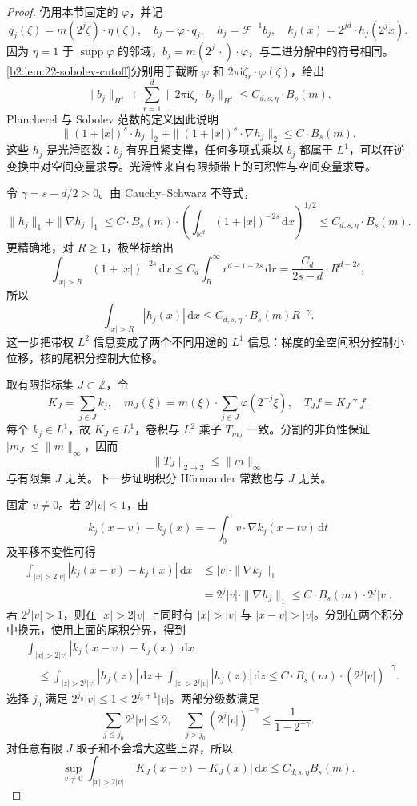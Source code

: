\begin{proof}
仍用本节固定的 \(\varphi\)，并记
\[
 q_j(\zeta)=m(2^j\zeta)\cdot\eta(\zeta),\quad
 b_j=\varphi\cdot q_j,\quad h_j=\mathcal F^{-1}b_j,\quad
 k_j(x)=2^{jd}\cdot h_j(2^jx).
\]
因为 \(\eta=1\) 于 \(\operatorname{supp}\varphi\) 的邻域，\(b_j=m(2^j\,\cdot)\cdot\varphi\)，与二进分解中的符号相同。\cref{b2:lem:22-sobolev-cutoff}分别用于截断 \(\varphi\) 和 \(2\pi\mathrm i\zeta_r\cdot\varphi(\zeta)\)，给出
\[
 \|b_j\|_{H^s}+\sum_{r=1}^{d}
 \|2\pi\mathrm i\zeta_r\cdot b_j\|_{H^s}
 \leq C_{d,s,\eta}\cdot B_s(m).
\]
Plancherel 与 Sobolev 范数的定义因此说明
\[
 \|(1+|x|)^s\cdot h_j\|_2
 +\|(1+|x|)^s\cdot\nabla h_j\|_2
 \leq C\cdot B_s(m).
\]
这些 \(h_j\) 是光滑函数：\(b_j\) 有界且紧支撑，任何多项式乘以 \(b_j\) 都属于 \(L^1\)，可以在逆变换中对空间变量求导。光滑性来自有限频带上的可积性与空间变量求导。

令 \(\gamma=s-d/2>0\)。由 Cauchy--Schwarz 不等式，
\[
 \|h_j\|_1+\|\nabla h_j\|_1
 \leq C\cdot B_s(m)\cdot
 \left(\int_{\mathbb R^d}(1+|x|)^{-2s}\,\mathrm dx\right)^{1/2}
 \leq C_{d,s,\eta}\cdot B_s(m).
\]
更精确地，对 \(R\geq1\)，极坐标给出
\[
 \int_{|x|>R}(1+|x|)^{-2s}\,\mathrm dx
 \leq C_d\int_R^\infty r^{d-1-2s}\,\mathrm dr
 =\frac{C_d}{2s-d}\cdot R^{d-2s},
\]
所以
\[
 \int_{|x|>R}|h_j(x)|\,\mathrm dx
 \leq C_{d,s,\eta}\cdot B_s(m)R^{-\gamma}.
\]
这一步把带权 \(L^2\) 信息变成了两个不同用途的 \(L^1\) 信息：梯度的全空间积分控制小位移，核的尾积分控制大位移。

取有限指标集 \(J\subset\mathbb Z\)，令
\[
 K_J=\sum_{j\in J}k_j,\quad
 m_J(\xi)=m(\xi)\cdot\sum_{j\in J}\varphi(2^{-j}\xi),
 \quad T_Jf=K_J*f.
\]
每个 \(k_j\in L^1\)，故 \(K_J\in L^1\)，卷积与 \(L^2\) 乘子 \(T_{m_J}\) 一致。分割的非负性保证 \(|m_J|\leq\|m\|_\infty\)，因而
\[
 \|T_J\|_{2\to2}\leq\|m\|_\infty
\]
与有限集 \(J\) 无关。下一步证明积分 Hörmander 常数也与 \(J\) 无关。

固定 \(v\ne0\)。若 \(2^j|v|\leq1\)，由
\[
 k_j(x-v)-k_j(x)
 =-\int_0^1v\cdot\nabla k_j(x-tv)\,\mathrm dt
\]
及平移不变性可得
\[
 \begin{aligned}
 \int_{|x|>2|v|}|k_j(x-v)-k_j(x)|\,\mathrm dx
 &\leq|v|\cdot\|\nabla k_j\|_1\\
 &=2^j|v|\cdot\|\nabla h_j\|_1
 \leq C\cdot B_s(m)\cdot2^j|v|.
 \end{aligned}
\]
若 \(2^j|v|>1\)，则在 \(|x|>2|v|\) 上同时有 \(|x|>|v|\) 与 \(|x-v|>|v|\)。分别在两个积分中换元，使用上面的尾积分界，得到
\[
 \begin{aligned}
 &\int_{|x|>2|v|}|k_j(x-v)-k_j(x)|\,\mathrm dx\\
 &\quad\leq
 \int_{|z|>2^j|v|}|h_j(z)|\,\mathrm dz+
 \int_{|z|>2^j|v|}|h_j(z)|\,\mathrm dz
 \leq C\cdot B_s(m)\cdot(2^j|v|)^{-\gamma}.
 \end{aligned}
\]
选择 \(j_0\) 满足 \(2^{j_0}|v|\leq1<2^{j_0+1}|v|\)。两部分级数满足
\[
 \sum_{j\leq j_0}2^j|v|\leq2,\quad
 \sum_{j>j_0}(2^j|v|)^{-\gamma}
 \leq\frac{1}{1-2^{-\gamma}}.
\]
对任意有限 \(J\) 取子和不会增大这些上界，所以
\[
 \sup_{v\ne0}\int_{|x|>2|v|}
 |K_J(x-v)-K_J(x)|\,\mathrm dx
 \leq C_{d,s,\eta}B_s(m).
\]


\end{proof}
